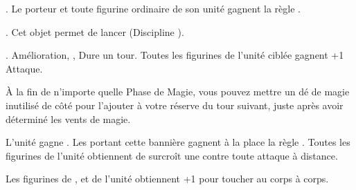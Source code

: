 \endpricelist

\armyenchanteditems

\startpricelist

 . Le porteur et toute figurine ordinaire de son unité gagnent la règle \distracting{}.

\endpricelist

\armyarcaneitems

\startpricelist

 . Cet objet permet de lancer \necromancyspelltwo{} (Discipline \necromancy{}).

 . Amélioration, , Dure un tour. Toutes les figurines de l'unité ciblée gagnent +1 Attaque.

 À la fin de n'importe quelle Phase de Magie, vous pouvez mettre un dé de magie inutilisé de côté pour l'ajouter à votre réserve du tour suivant, juste après avoir déterminé les vents de magie.

\endpricelist

\armymagicbanners

\startpricelist

 L'unité gagne \bodyguard{\vampirelord, \vampirehero}. Les \vampireknights{} portant cette bannière gagnent à la place la règle \stubborn{}. Toutes les figurines de l'unité obtiennent de surcroît une  contre toute attaque à distance. 

 Les figurines de \barrowknights, \barrowguards{} et \barrowkings{} de l'unité obtiennent +1 pour toucher au corps à corps.

\endpricelist







\armylist

\lordstitle

